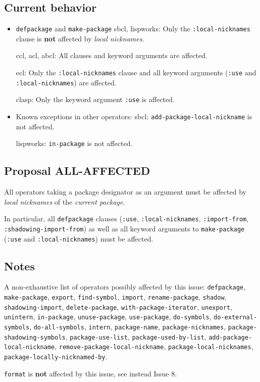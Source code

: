\documentclass[11pt]{article}
\begin{document}
\subsection{Current behavior}
\label{sec:org38698e6}
\begin{itemize}
\item \texttt{defpackage} and \texttt{make-package}
sbcl, lispworks:
  Only the \texttt{:local-nicknames} clause is \textbf{not} affected by \emph{local nicknames}.

ccl, acl, abcl:
  All clauses and keyword arguments are affected.

ecl:
  Only the \texttt{:local-nicknames} clause and all keyword arguments (\texttt{:use} and
  \texttt{:local-nicknames}) are affected.

clasp:
  Only the keyword argument \texttt{:use} is affected.
\item Known exceptions in other operators:
sbcl: \texttt{add-package-local-nickname} is not affected.

lispworks: \texttt{in-package} is not affected.
\end{itemize}
\subsection{Proposal ALL-AFFECTED}
\label{sec:org7f96385}
All operators taking a package designator as an argument must be affected by
\emph{local nicknames} of the \emph{current package}.

In particular, all \texttt{defpackage} clauses (\texttt{:use}, \texttt{:local-nicknames},
\texttt{:import-from}, \texttt{:shadowing-import-from}) as well as all keyword arguments to
\texttt{make-package} (\texttt{:use} and \texttt{:local-nicknames}) must be affected.
\subsection{Notes}
\label{sec:org7ad7b2d}
A non-exhaustive list of operators possibly affected by this issue:
  \texttt{defpackage}, \texttt{make-package}, \texttt{export}, \texttt{find-symbol}, \texttt{import},
  \texttt{rename-package}, \texttt{shadow}, \texttt{shadowing-import}, \texttt{delete-package},
  \texttt{with-package-iterator}, \texttt{unexport}, \texttt{unintern}, \texttt{in-package}, \texttt{unuse-package},
  \texttt{use-package}, \texttt{do-symbols}, \texttt{do-external-symbols}, \texttt{do-all-symbols}, \texttt{intern},
  \texttt{package-name}, \texttt{package-nicknames}, \texttt{package-shadowing-symbols},
  \texttt{package-use-list}, \texttt{package-used-by-list}, \texttt{add-package-local-nickname},
  \texttt{remove-package-local-nickname}, \texttt{package-local-nicknames},
  \texttt{package-locally-nicknamed-by}.

\texttt{format} is \textbf{not} affected by this issue, see instead Issue 8.
\end{document}
